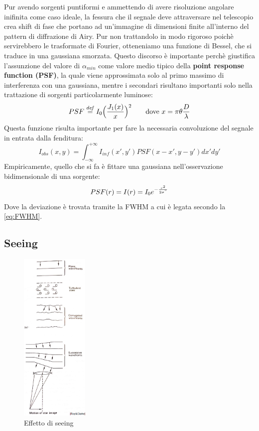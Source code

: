 Pur avendo sorgenti puntiformi e ammettendo di avere risoluzione angolare inifinita come caso ideale, la fessura che il segnale deve attraversare nel telescopio crea shift di fase che portano ad un'immagine di dimensioni finite all'interno del pattern di diffrazione di Airy. Pur non trattandolo in modo rigoroso poichè servirebbero le trasformate di Fourier, otteneniamo una funzione di Bessel, che si traduce in una gaussiana smorzata. Questo discorso è importante perchè giustifica l'assunzione del valore di $\alpha_{min}$ come valore medio tipico della \textbf{point response function (PSF)}, la quale viene approssimata solo al primo massimo di interferenza con una gaussiana, mentre i secondari risultano importanti solo nella trattazione di sorgenti particolarmente luminose:
\begin{equation}
	\label{def:PSF}
	PSF \overset{\mathit{def}}{=} I_0 \Bigl( \frac{J_1(x)}{x} \Bigr)^2 \qquad
	\text{dove } x=\pi\theta \frac{D}{\lambda}
\end{equation}
Questa funzione risulta importante per fare la necessaria convoluzione del segnale in entrata dalla fenditura:
\begin{equation}
	I_{obs}(x,y)=\int_{-\infty}^{+\infty} I_{inf}(x',y')PSF(x-x',y-y')dx'dy'
\end{equation}
Empiricamente, quello che si fa è fittare una gaussiana nell'osservazione bidimensionale di una sorgente:
\begin{equation}
	PSF(r)=I(r)=I_0e^{-\frac{r^2}{2\sigma^"}}
\end{equation}
Dove la deviazione è trovata tramite la FWHM a cui è legata secondo la \ref{eq:FWHM}.

\subsection*{Seeing}

\begin{figure}
	\vspace{-10pt}
	\centering
	\includegraphics[width=0.29\textwidth]{Immagini/Capitolo2/Seeing.PNG}
	\caption{Effetto di seeing}
	\vspace{-10pt}
\end{figure}

